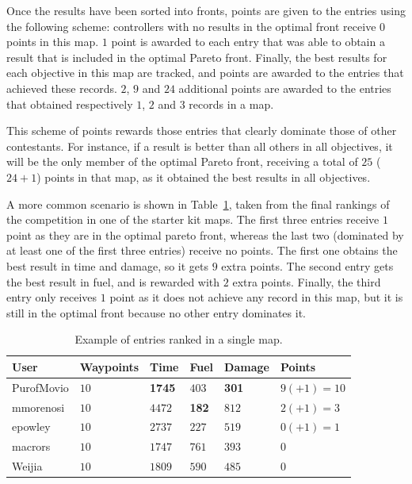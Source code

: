 \documentclass[conference]{IEEEtran}
\begin{document}
Once the results have been sorted into fronts, points are given to the entries using the following scheme: controllers with no results in the optimal front receive $0$ points in this map. $1$ point is awarded to each entry that was able to obtain a result that is included in the optimal Pareto front. Finally, the best results for each objective in this map are tracked, and points are awarded to the entries that achieved these records. $2$, $9$ and $24$ additional points are awarded to the entries that obtained respectively $1$, $2$ and $3$ records in a map.

This scheme of points rewards those entries that clearly dominate those of other contestants. For instance, if a result is better than all others in all objectives, it will be the only member of the optimal Pareto front, receiving a total of $25$ ($24 + 1$) points in that map, as it obtained the best results in all objectives.

A more common scenario is shown in Table~\ref{tab:rankingSample}, taken from the final rankings of the competition in one of the starter kit maps. The first three entries receive $1$ point as they are in the optimal pareto front, whereas the last two (dominated by at least one of the first three entries) receive no points. The first one obtains the best result in time and damage, so it gets $9$ extra points. The second entry gets the best result in fuel, and is rewarded with $2$ extra points. Finally, the third entry only receives $1$ point as it does not achieve any record in this map, but it is still in the optimal front because no other entry dominates it.

\begin{table}[!t]
\begin{center}
\begin{tabular}{|>{\centering\arraybackslash}m{1.25cm}|>{\centering\arraybackslash}m{1.15cm}|>{\centering\arraybackslash}m{0.5cm}|>{\centering\arraybackslash}m{0.5cm}|>{\centering\arraybackslash}m{0.9cm}|>{\centering\arraybackslash}m{1.5cm}|}
\hline
 \textbf{User} & \textbf{Waypoints} & \textbf{Time} & \textbf{Fuel} & \textbf{Damage} & \textbf{Points} \\ 
\hline
PurofMovio & $10$ & \textbf{1745} & $403$ & \textbf{301} & $9 (+1) = 10$\\
\hline
mmorenosi & $10$ & $4472$ & \textbf{182} & $812$ & $2 (+1) = 3$\\
\hline
epowley & $10$ & $2737$ & $227$ & $519$ & $0 (+1) = 1$\\
\hline
\hline
macrors & $10$ & $1747$ & $761$ & $393$ & $0$\\
\hline
Weijia & $10$ & $1809$ & $590$ & $485$ & $0$\\
\hline
\end{tabular}
\caption{Example of entries ranked in a single map. }
\label{tab:rankingSample}
\end{center}
\end{table}
\end{document}
